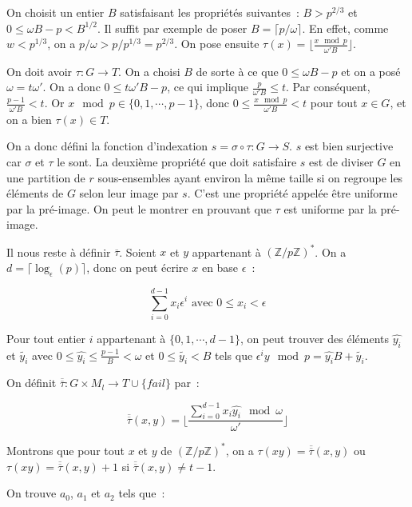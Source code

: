     On choisit un entier $B$ satisfaisant les propriétés suivantes~:  $B > p^{2/3}$ et $0 \leq \omega B - p < B^{1/2}$. Il suffit par exemple de poser $B = \lceil p/\omega \rceil$. En effet, comme $w < p^{1/3}$, on a $p/\omega > p/p^{1/3} = p^{2/3}$. On pose ensuite $\tau(x) = \lfloor \frac{x\mod p}{\omega' B} \rfloor$.

    On doit avoir $\tau : G \longrightarrow T$. On a choisi $B$ de sorte à ce que $0 \leq \omega B - p$ et on a posé $\omega = t\omega'$. On a donc $0 \leq t \omega' B - p$, ce qui implique $\frac{p}{\omega' B} \leq t$. Par conséquent, $\frac{p-1}{\omega' B} < t$. Or $x\mod p \in \{0,1,\cdots,p-1\}$, donc $0 \leq \frac{x\mod p}{\omega' B} < t$ pour tout $x \in G$, et on a bien $\tau(x) \in T$.

    On a donc défini la fonction d'indexation $s = \sigma \circ \tau : G \longrightarrow S$. $s$ est bien surjective car $\sigma$ et $\tau$ le sont. La deuxième propriété que doit satisfaire $s$ est de diviser $G$ en une partition de $r$ sous-ensembles ayant environ la même taille si on regroupe les éléments de $G$ selon leur image par $s$. C'est une propriété appelée être uniforme par la pré-image. On peut le montrer en prouvant que $\tau$ est uniforme par la pré-image.

    Il nous reste à définir $\overline{\tau}$. Soient $x$ et $y$ appartenant à $(\mathbb{Z}/p\mathbb{Z})^*$. On a $d = \lceil\log_\epsilon(p)\rceil$, donc on peut écrire $x$ en base $\epsilon$~:

    $$ \sum_{i=0}^{d-1} x_i \epsilon^i \text{ avec $0 \leq x_i < \epsilon$} $$

    Pour tout entier $i$ appartenant à $\{0,1,\cdots,d-1\}$, on peut trouver des éléments $\hat{y_i}$ et $\tilde{y_i}$ avec $0 \leq \hat{y_i} \leq \frac{p-1}{B} < \omega$ et $0 \leq \tilde{y_i} < B$ tels que $\epsilon^i y\mod p = \hat{y_i} B + \tilde{y_i}$.

    On définit $\overline{\overline{\tau}} : G \times M_l \longrightarrow T \cup \{fail\}$ par~:

    $$\overline{\overline{\tau}}(x,y) = \lfloor \frac{\sum_{i=0}^{d-1} x_i \hat{y_i}\mod \omega}{\omega'} \rfloor$$

    Montrons que pour tout $x$ et $y$ de $(\mathbb{Z}/p\mathbb{Z})^*$, on a $\tau(xy) = \overline{\overline{\tau}}(x,y)$ ou $\tau(xy) = \overline{\overline{\tau}}(x,y) + 1$ si $\overline{\overline{\tau}}(x,y) \neq t - 1$.

    On trouve $a_0$, $a_1$ et $a_2$ tels que~:

